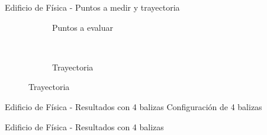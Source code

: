 \documentclass[xcolor=table]{beamer}
\begin{document}
  \begin{frame}{Edificio de Física - Puntos a medir y trayectoria}
    \begin{figure}[H]
      \begin{subfigure}[b]{.42\textwidth}
        \centering
        \def\svgwidth{\linewidth}
         
        \caption{Puntos a evaluar}
        \label{fig:puntos_fisica}
      \end{subfigure}
      ~~
      \begin{subfigure}[b]{.42\textwidth}
        \centering
        \def\svgwidth{\linewidth}
         
        \caption{Trayectoria}
        \label{fig:trayecto_fisica}
      \end{subfigure}
      \label{fig:fisica}
    \end{figure}
  \end{frame}

  \begin{frame}{Edificio de Física - Resultados con 4 balizas}
    Configuración de 4 balizas
    \begin{figure}[H]
      \centering
      \def\svgwidth{0.5\linewidth}
       
      \label{fig:sensores_fisica_4}
    \end{figure}
  \end{frame}
  
  \begin{frame}{Edificio de Física - Resultados con 4 balizas}
    \begin{figure}[H]
      \centering
      \scalebox{0.6}{}
      \label{fig:res_fisica_4}
    \end{figure}
  \end{frame}
  
\end{document}
